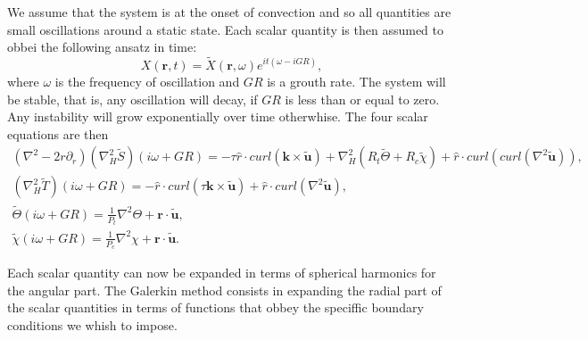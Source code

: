\documentclass[a4paper,10pt]{book}
\renewcommand{\vec}[1]{\mathbf{#1}}
\begin{document}
We assume that the system is at the onset of convection and so all quantities
are small oscillations around a static state. Each scalar quantity is then
assumed to obbei the following ansatz in time:
\begin{equation}
 X(\vec r, t) = \tilde X(\vec r,\omega) e^{it(\omega-iGR)},
\end{equation}
where $\omega$ is the frequency of oscillation and $GR$ is a grouth rate. The
system will be stable, that is, any oscillation will decay, if $GR$ is less than
or equal to zero. Any instability will grow exponentially over time otherwhise.
The four scalar equations are then
\begin{subequations}
\begin{gather}
\label{eq:Poloidal}
(\nabla^2-2r\partial_r)(\nabla^2_{H} \tilde S) (i\omega +GR)= - \tau \hat r \cdot curl (\vec k \times \tilde{\vec u})  + \nabla^2_{H}(R_t \tilde\Theta +R_c \tilde\chi ) + \hat r \cdot curl (curl(\nabla^2 \tilde{\vec u})), \\
\label{eq:Toroidal}
(\nabla^2_{H} \tilde T) (i\omega +GR) = - \hat r \cdot curl (\tau \vec k \times \tilde{\vec u})  + \hat r \cdot curl (\nabla^2 \tilde{\vec u}), \\
\label{eq:temp}
\tilde \Theta (i\omega +GR) = \frac{1}{P_t}\nabla^2 \Theta + \vec r \cdot \tilde{\vec u} , \\
\label{eq:comp}
\tilde \chi  (i\omega +GR) = \frac{1}{P_c}\nabla^2 \chi  + \vec r \cdot \tilde{\vec u} .
\end{gather}
\end{subequations}

Each scalar quantity can now be expanded in terms of spherical harmonics for the
angular part. The Galerkin method consists in expanding the radial part of the
scalar quantities in terms of functions that obbey the speciffic boundary
conditions we whish to impose.
\end{document}
